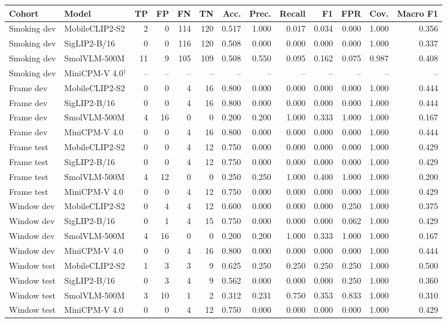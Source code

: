 \begin{longtable}{llrrrrrrrrrrr}
\toprule
Cohort & Model & TP & FP & FN & TN & Acc. & Prec. & Recall & F1 & FPR & Cov. & Macro F1 \\
\midrule\endhead
Smoking dev & MobileCLIP2-S2 & 2 & 0 & 114 & 120 & 0.517 & 1.000 & 0.017 & 0.034 & 0.000 & 1.000 & 0.356 \\
Smoking dev & SigLIP2-B/16 & 0 & 0 & 116 & 120 & 0.508 & 0.000 & 0.000 & 0.000 & 0.000 & 1.000 & 0.337 \\
Smoking dev & SmolVLM-500M & 11 & 9 & 105 & 109 & 0.508 & 0.550 & 0.095 & 0.162 & 0.075 & 0.987 & 0.408 \\
Smoking dev & MiniCPM-V 4.0$^\dagger$ & -- & -- & -- & -- & -- & -- & -- & -- & -- & -- & -- \\
Frame dev & MobileCLIP2-S2 & 0 & 0 & 4 & 16 & 0.800 & 0.000 & 0.000 & 0.000 & 0.000 & 1.000 & 0.444 \\
Frame dev & SigLIP2-B/16 & 0 & 0 & 4 & 16 & 0.800 & 0.000 & 0.000 & 0.000 & 0.000 & 1.000 & 0.444 \\
Frame dev & SmolVLM-500M & 4 & 16 & 0 & 0 & 0.200 & 0.200 & 1.000 & 0.333 & 1.000 & 1.000 & 0.167 \\
Frame dev & MiniCPM-V 4.0 & 0 & 0 & 4 & 16 & 0.800 & 0.000 & 0.000 & 0.000 & 0.000 & 1.000 & 0.444 \\
Frame test & MobileCLIP2-S2 & 0 & 0 & 4 & 12 & 0.750 & 0.000 & 0.000 & 0.000 & 0.000 & 1.000 & 0.429 \\
Frame test & SigLIP2-B/16 & 0 & 0 & 4 & 12 & 0.750 & 0.000 & 0.000 & 0.000 & 0.000 & 1.000 & 0.429 \\
Frame test & SmolVLM-500M & 4 & 12 & 0 & 0 & 0.250 & 0.250 & 1.000 & 0.400 & 1.000 & 1.000 & 0.200 \\
Frame test & MiniCPM-V 4.0 & 0 & 0 & 4 & 12 & 0.750 & 0.000 & 0.000 & 0.000 & 0.000 & 1.000 & 0.429 \\
Window dev & MobileCLIP2-S2 & 0 & 4 & 4 & 12 & 0.600 & 0.000 & 0.000 & 0.000 & 0.250 & 1.000 & 0.375 \\
Window dev & SigLIP2-B/16 & 0 & 1 & 4 & 15 & 0.750 & 0.000 & 0.000 & 0.000 & 0.062 & 1.000 & 0.429 \\
Window dev & SmolVLM-500M & 4 & 16 & 0 & 0 & 0.200 & 0.200 & 1.000 & 0.333 & 1.000 & 1.000 & 0.167 \\
Window dev & MiniCPM-V 4.0 & 0 & 0 & 4 & 16 & 0.800 & 0.000 & 0.000 & 0.000 & 0.000 & 1.000 & 0.444 \\
Window test & MobileCLIP2-S2 & 1 & 3 & 3 & 9 & 0.625 & 0.250 & 0.250 & 0.250 & 0.250 & 1.000 & 0.500 \\
Window test & SigLIP2-B/16 & 0 & 3 & 4 & 9 & 0.562 & 0.000 & 0.000 & 0.000 & 0.250 & 1.000 & 0.360 \\
Window test & SmolVLM-500M & 3 & 10 & 1 & 2 & 0.312 & 0.231 & 0.750 & 0.353 & 0.833 & 1.000 & 0.310 \\
Window test & MiniCPM-V 4.0 & 0 & 0 & 4 & 12 & 0.750 & 0.000 & 0.000 & 0.000 & 0.000 & 1.000 & 0.429 \\
\bottomrule
\end{longtable}
